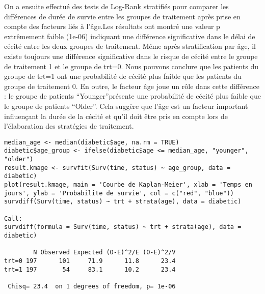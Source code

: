 \documentclass[../main.tex]{subfiles}
\begin{document}
\begin{CJK*}{UTF8}{gbsn}
On a ensuite effectué des tests de Log-Rank stratifiés pour comparer les différences de durée de survie entre les groupes de traitement après prise en compte des facteurs liés à l'âge.Les résultats ont montré une valeur p extrêmement faible (1e-06) indiquant une différence significative dans le délai de cécité entre les deux groupes de traitement. Même après stratification par âge, il existe toujours une différence significative dans le risque de cécité entre le groupe de traitement 1 et le groupe de trt=0. Nous pouvons conclure que les patients du groupe de trt=1 ont une probabilité de cécité plus faible que les patients du groupe de traitement 0. En outre, le facteur âge joue un rôle dans cette différence : le groupe de patients “Younger”présente une probabilité de cécité plus faible que le groupe de patients “Older”. Cela suggère que l'âge est un facteur important influençant la durée de la cécité et qu'il doit être pris en compte lors de l'élaboration des stratégies de traitement.
\begin{lstlisting}
median_age <- median(diabetic$age, na.rm = TRUE)
diabetic$age_group <- ifelse(diabetic$age <= median_age, "younger", "older")
result.kmage <- survfit(Surv(time, status) ~ age_group, data = diabetic)
plot(result.kmage, main = 'Courbe de Kaplan-Meier', xlab = 'Temps en jours', ylab = 'Probabilite de survie', col = c("red", "blue"))
survdiff(Surv(time, status) ~ trt + strata(age), data = diabetic)

Call:
survdiff(formula = Surv(time, status) ~ trt + strata(age), data = diabetic)

        N Observed Expected (O-E)^2/E (O-E)^2/V
trt=0 197      101     71.9      11.8      23.4
trt=1 197       54     83.1      10.2      23.4

 Chisq= 23.4  on 1 degrees of freedom, p= 1e-06
\end{lstlisting}


\end{CJK*}
\end{document}
